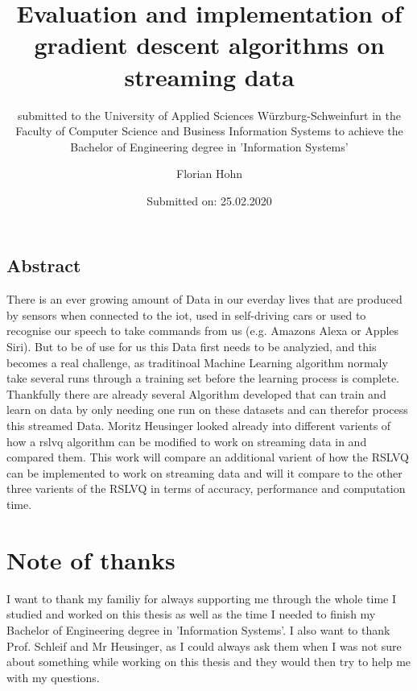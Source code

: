 \documentclass[12pt,oneside,a4paper,parskip]{scrbook}
\def\BaAuthor{Florian Hohn}
\def\BaTitle{Evaluation and implementation of gradient descent algorithms on streaming data}
\def\BaSupervisorOne{Prof.\ Dr.\ Frank-Michael Schleif}
\def\BaSupervisorTwo{Moritz Heusinger}
\def\BaDeadline{25.02.2020}
\begin{document}


\frontmatter
\titlehead{%
  {University of Applied Sciences W\"{u}rzburg-Schweinfurt
  Faculty of Computer Science and Business Information Systems}}
\subject{Bachelor-Thesis}
\title{\BaTitle\\[15mm]}
\subtitle{\normalsize{submitted to the University of Applied Sciences W\"{u}rzburg-Schweinfurt in the Faculty of Computer Science and Business Information Systems to achieve the Bachelor of Engineering degree in 'Information Systems'}}
\author{\BaAuthor}
\date{\normalsize{Submitted on: \BaDeadline}}
\publishers{
  \normalsize{First Reader: \BaSupervisorOne}\\
  \normalsize{Second Reader: \BaSupervisorTwo}\\
}


\maketitle



\section*{Abstract}
There is an ever growing amount of Data in our everday lives that are produced by sensors when connected to 
the \ac{iot}, used in self-driving cars or used to recognise our speech to take commands from us
(e.g. Amazons Alexa or Apples Siri). But to be of use for us this Data first needs to be analyzied, and this 
becomes a real challenge, as traditinoal Machine Learning algorithm normaly take several runs through a training set before 
the learning process is complete.
Thankfully there are already several Algorithm developed that can train and learn on data by only needing one run on 
these datasets and can therefor process this streamed Data.
Moritz Heusinger looked already into different varients of how a \ac{rslvq} algorithm can be modified to work on streaming data
in \cite{PassiveDriftonRSLVQ} and compared them.
This work will compare an additional varient of how the RSLVQ can be implemented to work on streaming data and will it 
compare to the other three varients of the RSLVQ in terms of accuracy, performance and computation time.

\newpage
\chapter*{Note of thanks}
I want to thank my familiy for always supporting me through the whole time I studied and worked on this thesis as well
as the time I needed to finish my Bachelor of Engineering degree in 'Information Systems'.
I also want to thank Prof. Schleif and Mr Heusinger, as I could always ask them when I was not sure about something while working on 
this thesis and they would then try to help me with my questions.
\end{document}
